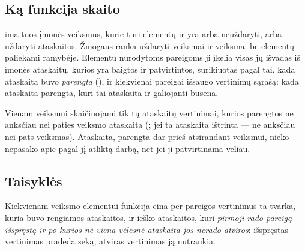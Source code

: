 \subsection{Ką funkcija skaito}

 ima tuos įmonės veiksmus, kurie turi elementų ir yra arba neuždaryti, arba uždaryti
ataskaitos. Žmogaus ranka uždaryti veiksmai ir veiksmai be elementų paliekami ramybėje. Elementų
nurodytoms pareigoms ji įkelia visas jų išvadas iš įmonės ataskaitų, kurios yra baigtos ir
patvirtintos, surikiuotas pagal tai, kada ataskaita buvo \emph{parengta} (), ir
kiekvienai pareigai išsaugo vertinimų sąrašą: kada ataskaita parengta, kuri tai ataskaita ir
galiojanti būsena.

Vienam veiksmui skaičiuojami tik tų ataskaitų vertinimai, kurios parengtos ne anksčiau nei paties
veiksmo ataskaita (; jei ta ataskaita ištrinta --- ne anksčiau nei pats veiksmas). Ataskaita, parengta dar prieš atsirandant veiksmui, nieko nepasako apie
pagal jį atliktą darbą, net jei ji patvirtinama vėliau.

\subsection{Taisyklės}

Kiekvienam veiksmo elementui funkcija eina per pareigos vertinimus ta tvarka, kuria buvo rengiamos
ataskaitos, ir ieško ataskaitos, kuri \emph{pirmoji rado pareigą išspręstą ir po kurios nė viena
vėlesnė ataskaita jos nerado atviros}: išspręstas vertinimas pradeda seką, atviras vertinimas ją
nutraukia.


